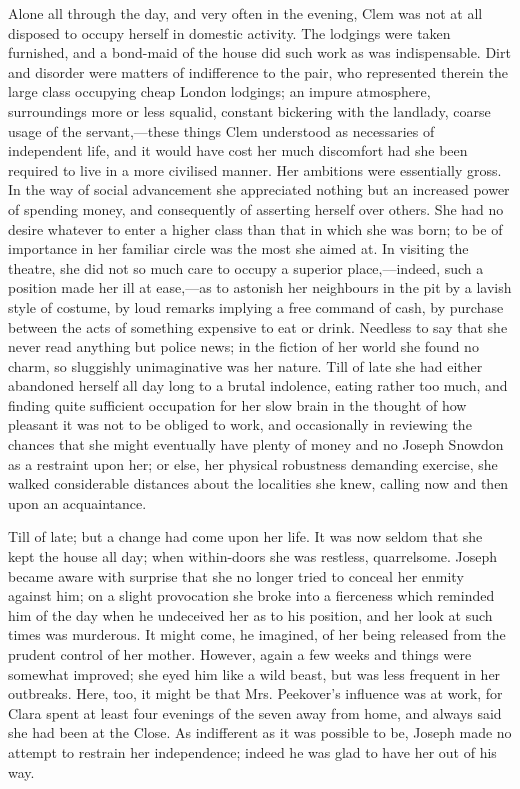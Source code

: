 Alone all through the day, and very often in the evening, Clem was not
at all disposed to occupy herself in domestic activity. The lodgings
were taken furnished, and a bond-maid of the house did such work as was
indispensable. Dirt and disorder were matters of indifference to the
pair, who represented therein the large class occupying cheap {}London
lodgings; an impure atmosphere, surroundings more or less squalid,
constant bickering with the landlady, coarse usage of the
servant,---these things Clem understood as necessaries of independent
life, and it would have cost her much discomfort had she been required
to live in a more civilised manner. Her ambitions were essentially
gross. In the way of social advancement she appreciated nothing but an
increased power of spending money, and consequently of asserting herself
over others. She had no desire whatever to enter a higher class than
that in which she was born; to be of importance in her familiar circle
was the most she aimed at. In visiting the theatre, she did not so much
care to occupy a superior place,---indeed, such a position made her ill
at ease,---as to astonish her neighbours in the pit by a lavish style of
costume, by loud remarks implying a free command of cash, by purchase
between the acts of something expensive to eat or drink. Needless to say
that she never read anything but police news; in the fiction of her
world she found no charm, so sluggishly unimaginative was her nature.
Till of late she had {}either abandoned herself all day long to a brutal
indolence, eating rather too much, and finding quite sufficient
occupation for her slow brain in the thought of how pleasant it was not
to be obliged to work, and occasionally in reviewing the chances that
she might eventually have plenty of money and no Joseph Snowdon as a
restraint upon her; or else, her physical robustness demanding exercise,
she walked considerable distances about the localities she knew, calling
now and then upon an acquaintance.

Till of late; but a change had come upon her life. It was now seldom
that she kept the house all day; when within-doors she was restless,
quarrelsome. Joseph became aware with surprise that she no longer tried
to conceal her enmity against him; on a slight provocation she broke
into a fierceness which reminded him of the day when he undeceived her
as to his position, and her look at such times was murderous. It might
come, he imagined, of her being released from the prudent control of her
mother. However, again a few weeks and things were somewhat improved;
she eyed him like a wild beast, but {}was less frequent in her
outbreaks. Here, too, it might be that Mrs. Peekover's influence was at
work, for Clara spent at least four evenings of the seven away from
home, and always said she had been at the Close. As indifferent as it
was possible to be, Joseph made no attempt to restrain her independence;
indeed he was glad to have her out of his way.

